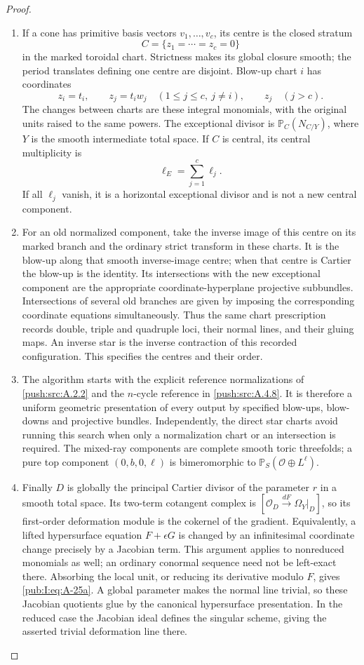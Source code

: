 \begin{proof}
\begin{enumerate}[label=\arabic*.,leftmargin=*]
\item  If a cone has primitive basis vectors
$v_1,\ldots,v_c$, its centre is the closed stratum
\[
 C=\{z_1=\cdots=z_c=0\}
\]
in the marked toroidal chart. Strictness makes its
global closure smooth; the period translates defining
one centre are disjoint. Blow-up chart $i$ has
coordinates
\[
 z_i=t_i,\qquad z_j=t_i w_j\quad
 (1\leq j\leq c,\ j\ne i),
 \qquad z_j\quad(j>c).
\]
The changes between charts are these integral
monomials, with the original units raised to the
same powers. The exceptional divisor is
$\mathbb P_C(N_{C/Y})$, where $Y$ is the smooth
intermediate total space. If $C$ is central, its
central multiplicity is
\[
 \ell_E=\sum_{j=1}^c\ell_j.
\]
If all $\ell_j$ vanish, it is a horizontal exceptional
divisor and is not a new central component.

\item For an old normalized component, take the inverse
image of this centre on its marked branch and the
ordinary strict transform in these charts. It is
the blow-up along that smooth inverse-image centre;
when that centre is Cartier the blow-up is the
identity. Its intersections with the new exceptional
component are the appropriate coordinate-hyperplane
projective subbundles. Intersections of several old
branches are given by imposing the corresponding
coordinate equations simultaneously. Thus the same
chart prescription records double, triple and
quadruple loci, their normal lines, and their 
gluing maps. An inverse star is the inverse
contraction of this recorded configuration. This
specifies the centres and their order.

\item The algorithm starts with the explicit reference
normalizations of \ref{push:src:A.2.2} and the $n$-cycle reference
in \ref{push:src:A.4.8}. It is therefore a uniform geometric
presentation of every output by specified blow-ups,
blow-downs and projective bundles. Independently,
the direct star charts avoid running this search
when only a normalization chart or an intersection
is required. The mixed-ray components are complete
smooth toric threefolds; a pure top component
$(0,b,0,\ell)$ is bimeromorphic to
$\mathbb P_S(\mathcal O\oplus L^\ell)$.

\item Finally $D$ is globally the principal Cartier
divisor of the parameter $r$ in a smooth total
space. Its two-term cotangent complex is
$[\mathcal O_D\xrightarrow{dF}\Omega_Y|_D]$,
so its first-order deformation module is the
cokernel of the gradient. Equivalently, a lifted
hypersurface equation $F+\epsilon G$ is changed by
an infinitesimal coordinate change precisely by a
Jacobian term. This argument applies to nonreduced
monomials as well; an ordinary conormal sequence
need not be left-exact there. Absorbing the local unit, or reducing its
derivative modulo $F$, gives \eqref{pub:I:eq:A-25a}. A global
parameter makes the normal line trivial, so these
Jacobian quotients glue by the canonical
hypersurface presentation. In the reduced case
the Jacobian ideal defines the singular scheme,
giving the asserted trivial deformation line there.


\end{enumerate}
\end{proof}
